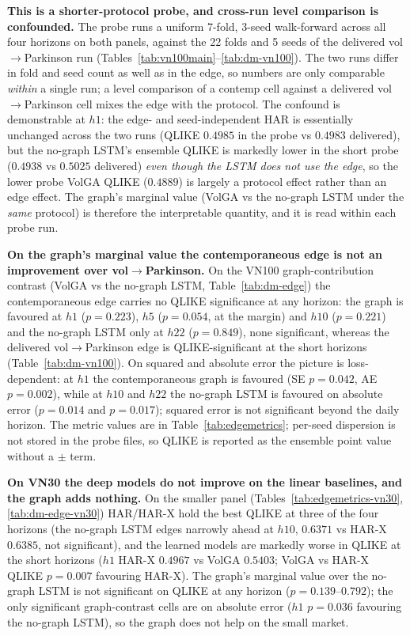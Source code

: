 \documentclass[runningheads]{llncs}
\begin{document}
\textbf{This is a shorter-protocol probe, and cross-run level comparison is confounded.} The probe
runs a uniform 7-fold, 3-seed walk-forward across all four horizons on both panels, against the 22
folds and 5 seeds of the delivered vol$\to$Parkinson run (Tables~\ref{tab:vn100main}--\ref{tab:dm-vn100}).
The two runs differ in fold and seed count as well as in the edge, so numbers are only comparable
\emph{within} a single run; a level comparison of a contemp cell against a delivered vol$\to$Parkinson
cell mixes the edge with the protocol. The confound is demonstrable at $h1$: the edge- and
seed-independent HAR is essentially unchanged across the two runs (QLIKE $0.4985$ in the probe vs
$0.4983$ delivered), but the no-graph LSTM's ensemble QLIKE is markedly lower in the short probe
($0.4938$ vs $0.5025$ delivered) \emph{even though the LSTM does not use the edge}, so the lower probe
VolGA QLIKE ($0.4889$) is largely a protocol effect rather than an edge effect. The graph's marginal
value (VolGA vs the no-graph LSTM under the \emph{same} protocol) is therefore the interpretable
quantity, and it is read within each probe run.

\textbf{On the graph's marginal value the contemporaneous edge is not an improvement over
vol$\to$Parkinson.} On the VN100 graph-contribution contrast (VolGA vs the no-graph LSTM,
Table~\ref{tab:dm-edge}) the contemporaneous edge carries no QLIKE significance at any horizon: the
graph is favoured at $h1$ ($p=0.223$), $h5$ ($p=0.054$, at the margin) and $h10$ ($p=0.221$) and the
no-graph LSTM only at $h22$ ($p=0.849$), none significant, whereas the delivered vol$\to$Parkinson
edge is QLIKE-significant at the short horizons (Table~\ref{tab:dm-vn100}). On squared and absolute error the picture is
loss-dependent: at $h1$ the contemporaneous graph is favoured (SE $p=0.042$, AE $p=0.002$), while at
$h10$ and $h22$ the no-graph LSTM is favoured on absolute error ($p=0.014$ and $p=0.017$); squared
error is not significant beyond the daily horizon. The metric values are in
Table~\ref{tab:edgemetrics}; per-seed dispersion is not stored in the probe files, so QLIKE is
reported as the ensemble point value without a $\pm$ term.

\textbf{On VN30 the deep models do not improve on the linear baselines, and the graph adds nothing.}
On the smaller panel (Tables~\ref{tab:edgemetrics-vn30}, \ref{tab:dm-edge-vn30}) HAR/HAR-X hold the
best QLIKE at three of the four horizons (the no-graph LSTM edges narrowly ahead at $h10$, $0.6371$ vs
HAR-X $0.6385$, not significant), and the learned models are markedly worse in QLIKE at the short
horizons ($h1$ HAR-X $0.4967$ vs VolGA $0.5403$; VolGA vs HAR-X QLIKE $p=0.007$ favouring HAR-X). The
graph's
marginal value over the no-graph LSTM is not significant on QLIKE at any horizon ($p=0.139$--$0.792$);
the only significant graph-contrast cells are on absolute error ($h1$ $p=0.036$ favouring the no-graph
LSTM), so the graph does not help on the small market.
\end{document}
